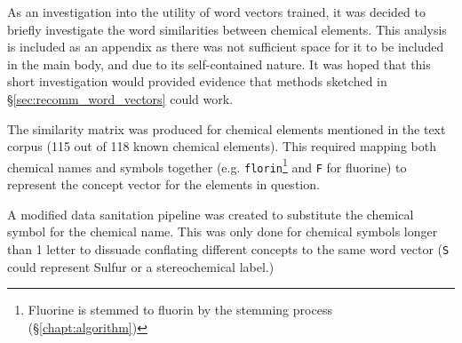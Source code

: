 As an investigation into the utility of word vectors trained, it was decided to briefly investigate the word similarities between chemical elements. This analysis is included as an appendix as there was not sufficient space for it to be included in the main body, and due to its self-contained nature. It was hoped that this short investigation would provided evidence that methods sketched in \S\ref{sec:recomm_word_vectors} could work.

The similarity matrix was produced for chemical elements mentioned in the text corpus (115 out of 118 known chemical elements). This required mapping both chemical names and symbols together (e.g. \texttt{florin}\footnote{Fluorine is stemmed to fluorin by the stemming process (\S\ref{chapt:algorithm}) }  and \texttt{F} for fluorine) to represent the concept vector for the elements in question.

A modified data sanitation pipeline was created to substitute the chemical symbol for the chemical name. This was only done for chemical symbols longer than 1 letter to dissuade conflating different concepts to the same word vector (\texttt{S} could represent Sulfur or a stereochemical label.)
 
